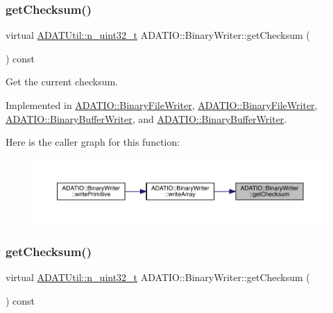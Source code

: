 \subsubsection{\texorpdfstring{getChecksum()}{getChecksum()}\hspace{0.1cm}{\footnotesize\ttfamily [1/2]}}
{\footnotesize\ttfamily virtual \mbox{\hyperlink{namespaceADATUtil_ad945a8afa4db2d1f89b731964adae97e}{A\+D\+A\+T\+Util\+::n\+\_\+uint32\+\_\+t}} A\+D\+A\+T\+I\+O\+::\+Binary\+Writer\+::get\+Checksum (\begin{DoxyParamCaption}{ }\end{DoxyParamCaption}) const\hspace{0.3cm}{\ttfamily [pure virtual]}}



Get the current checksum. 



Implemented in \mbox{\hyperlink{classADATIO_1_1BinaryFileWriter_ad6f9d995a02d4b3e8e12ad18972d58a5}{A\+D\+A\+T\+I\+O\+::\+Binary\+File\+Writer}}, \mbox{\hyperlink{classADATIO_1_1BinaryFileWriter_ad6f9d995a02d4b3e8e12ad18972d58a5}{A\+D\+A\+T\+I\+O\+::\+Binary\+File\+Writer}}, \mbox{\hyperlink{classADATIO_1_1BinaryBufferWriter_a3d7ec1583f03981f0a84571646be46f3}{A\+D\+A\+T\+I\+O\+::\+Binary\+Buffer\+Writer}}, and \mbox{\hyperlink{classADATIO_1_1BinaryBufferWriter_a3d7ec1583f03981f0a84571646be46f3}{A\+D\+A\+T\+I\+O\+::\+Binary\+Buffer\+Writer}}.

Here is the caller graph for this function\+:\nopagebreak
\begin{figure}[H]
\begin{center}
\leavevmode
\includegraphics[width=350pt]{db/dee/classADATIO_1_1BinaryWriter_a8bebb70a7248b14c8a4dcf7aa49c1503_icgraph}
\end{center}
\end{figure}
\mbox{\label{classADATIO_1_1BinaryWriter_a8bebb70a7248b14c8a4dcf7aa49c1503}} 
\subsubsection{\texorpdfstring{getChecksum()}{getChecksum()}\hspace{0.1cm}{\footnotesize\ttfamily [2/2]}}
{\footnotesize\ttfamily virtual \mbox{\hyperlink{namespaceADATUtil_ad945a8afa4db2d1f89b731964adae97e}{A\+D\+A\+T\+Util\+::n\+\_\+uint32\+\_\+t}} A\+D\+A\+T\+I\+O\+::\+Binary\+Writer\+::get\+Checksum (\begin{DoxyParamCaption}{ }\end{DoxyParamCaption}) const\hspace{0.3cm}{\ttfamily [pure virtual]}}



